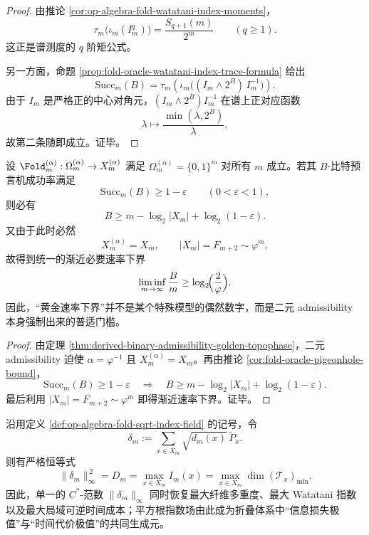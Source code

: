 \begin{proof}
由推论 \ref{cor:op-algebra-fold-watatani-index-moments}，
\[
\tau_m\!\bigl(\iota_m(I_m^q)\bigr)=\frac{S_{q+1}(m)}{2^m}
\qquad(q\ge 1).
\]
这正是谱测度的 \(q\) 阶矩公式。

另一方面，命题 \ref{prop:fold-oracle-watatani-index-trace-formula} 给出
\[
\mathrm{Succ}_m(B)
=
\tau_m\!\left(\iota_m\bigl((I_m\wedge 2^B)\,I_m^{-1}\bigr)\right).
\]
由于 \(I_m\) 是严格正的中心对角元，\((I_m\wedge 2^B)I_m^{-1}\) 在谱上正对应函数
\[
\lambda\longmapsto \frac{\min(\lambda,2^B)}{\lambda},
\]
故第二条随即成立。证毕。
\end{proof}

\begin{corollary}\label{cor:derived-binary-admissibility-golden-rate-floor}
设
\(
\Fold_m^{(\alpha)}:\Omega_m^{(\alpha)}\to X_m^{(\alpha)}
\)
满足
\(
\Omega_m^{(\alpha)}=\{0,1\}^m
\)
对所有 \(m\) 成立。若其 \(B\)-比特预言机成功率满足
\[
\mathrm{Succ}_m(B)\ge 1-\varepsilon
\qquad(0<\varepsilon<1),
\]
则必有
\[
B\ge m-\log_2|X_m|+\log_2(1-\varepsilon).
\]
又由于此时必然
\[
X_m^{(\alpha)}=X_m,
\qquad
|X_m|=F_{m+2}\sim \varphi^m,
\]
故得到统一的渐近必要速率下界
\[
\liminf_{m\to\infty}\frac{B}{m}\ge \log_2\!\Bigl(\frac{2}{\varphi}\Bigr).
\]
因此，“黄金速率下界”并不是某个特殊模型的偶然数字，而是二元 admissibility 本身强制出来的普适门槛。
\end{corollary}

\begin{proof}
由定理 \ref{thm:derived-binary-admissibility-golden-topophase}，二元 admissibility 迫使
\(
\alpha=\varphi^{-1}
\)
且 \(X_m^{(\alpha)}=X_m\)。再由推论 \ref{cor:fold-oracle-pigeonhole-bound}，
\[
\mathrm{Succ}_m(B)\ge 1-\varepsilon
\quad\Longrightarrow\quad
B\ge m-\log_2|X_m|+\log_2(1-\varepsilon).
\]
最后利用 \(|X_m|=F_{m+2}\sim \varphi^m\) 即得渐近速率下界。证毕。
\end{proof}

\begin{theorem}[平方根指数场的极值三重统一]\label{thm:derived-sqrt-index-field-triple-extremum}
沿用定义 \ref{def:op-algebra-fold-sqrt-index-field} 的记号，令
\[
\delta_m:=\sum_{x\in X_m}\sqrt{d_m(x)}\,\widetilde P_x.
\]
则有严格恒等式
\[
\|\delta_m\|_\infty^{\,2}
=
D_m
=
\max_{x\in X_m} I_m(x)
=
\max_{x\in X_m}\dim(\mathcal T_x)_{\min}.
\]
因此，单一的 \(C^\ast\)-范数 \(\|\delta_m\|_\infty\) 同时恢复最大纤维多重度、最大 Watatani 指数以及最大局域可逆时间成本；平方根指数场由此成为折叠体系中“信息损失极值”与“时间代价极值”的共同生成元。
\end{theorem}

